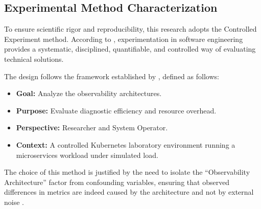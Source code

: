 \subsection{Experimental Method Characterization}
\label{sec:method-characterization}

To ensure scientific rigor and reproducibility, this research adopts the Controlled Experiment method. According to , experimentation in software engineering provides a systematic, disciplined, quantifiable, and controlled way of evaluating technical solutions. 

The design follows the framework established by , defined as follows:
\begin{itemize}
    \item \textbf{Goal:} Analyze the observability architectures.
    \item \textbf{Purpose:} Evaluate diagnostic efficiency and resource overhead.
    \item \textbf{Perspective:} Researcher and System Operator.
    \item \textbf{Context:} A controlled Kubernetes laboratory environment running a microservices workload under simulated load.
\end{itemize}

The choice of this method is justified by the need to isolate the ``Observability Architecture'' factor from confounding variables, ensuring that observed differences in metrics are indeed caused by the architecture and not by external noise \cite{wohlin_2012}.